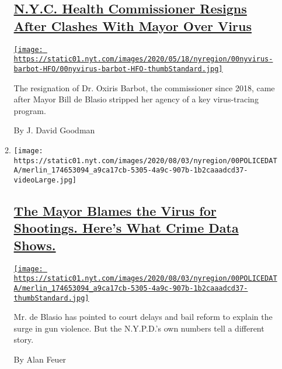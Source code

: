 \begin{enumerate}
\begin{enumerate}
    \hypertarget{nyc-health-commissioner-resigns-after-clashes-with-mayor-over-virus}{%
    \subsection{\texorpdfstring{\href{/2020/08/04/nyregion/oxiris-barbot-health-commissioner-resigns.html}{N.Y.C.
    Health Commissioner Resigns After Clashes With Mayor Over
    Virus}}{N.Y.C. Health Commissioner Resigns After Clashes With Mayor Over Virus}}\label{nyc-health-commissioner-resigns-after-clashes-with-mayor-over-virus}}

    \href{/2020/08/04/nyregion/oxiris-barbot-health-commissioner-resigns.html}{\texttt{[image: https://static01.nyt.com/images/2020/05/18/nyregion/00nyvirus-barbot-HFO/00nyvirus-barbot-HFO-thumbStandard.jpg]}}

    The resignation of Dr. Oxiris Barbot, the commissioner since 2018,
    came after Mayor Bill de Blasio stripped her agency of a key
    virus-tracing program.

    By J. David Goodman
  \item
    \texttt{[image: https://static01.nyt.com/images/2020/08/03/nyregion/00POLICEDATA/merlin\_174653094\_a9ca17cb-5305-4a9c-907b-1b2caaadcd37-videoLarge.jpg]}

    \hypertarget{the-mayor-blames-the-virus-for-shootings-heres-what-crime-data-shows}{%
    \subsection{\texorpdfstring{\href{/2020/08/04/nyregion/nyc-shootings-coronavirus.html}{The
    Mayor Blames the Virus for Shootings. Here's What Crime Data
    Shows.}}{The Mayor Blames the Virus for Shootings. Here's What Crime Data Shows.}}\label{the-mayor-blames-the-virus-for-shootings-heres-what-crime-data-shows}}

    \href{/2020/08/04/nyregion/nyc-shootings-coronavirus.html}{\texttt{[image: https://static01.nyt.com/images/2020/08/03/nyregion/00POLICEDATA/merlin\_174653094\_a9ca17cb-5305-4a9c-907b-1b2caaadcd37-thumbStandard.jpg]}}

    Mr. de Blasio has pointed to court delays and bail reform to explain
    the surge in gun violence. But the N.Y.P.D.'s own numbers tell a
    different story.

    By Alan Feuer
  \end{enumerate}
\end{enumerate}

